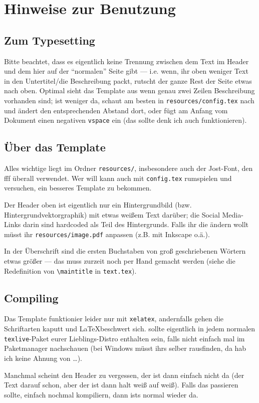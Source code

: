 \documentclass[a4paper]{article}
\newcommand{\maintitle}{F{\small FF-}T{\small EMPLATE}}
\begin{document}
\makeheader

\section{Hinweise zur Benutzung}

\subsection*{Zum Typesetting}

Bitte beachtet, dass es eigentlich keine Trennung zwischen dem Text im Header und dem hier auf der \enquote{normalen} Seite gibt --- i.e. wenn, ihr oben weniger Text in den Untertitel/die Beschreibung packt, rutscht der ganze Rest der Seite etwas nach oben. Optimal sieht das Template aus wenn genau zwei Zeilen Beschreibung vorhanden sind; ist weniger da, schaut am besten in \lstinline{resources/config.tex} nach und ändert den entsprechenden Abstand dort, oder fügt am Anfang vom Dokument einen negativen \lstinline{vspace} ein (das sollte denk ich auch funktionieren).

\subsection*{Über das Template}

Alles wichtige liegt im Ordner \lstinline{resources/}, insbesondere auch der Jost-Font, den fff überall verwendet. Wer will kann auch mit \lstinline{config.tex} rumspielen und versuchen, ein besseres Template zu bekommen.

Der Header oben ist eigentlich nur ein Hintergrundbild (bzw. Hintergrundvektorgraphik) mit etwas weißem Text darüber; die Social Media-Links darin sind hardcoded als Teil des Hintergrunds. Falls ihr die ändern wollt müsst ihr \lstinline{resources/image.pdf} anpassen (z.B. mit Inkscape o.ä.).

In der Überschrift sind die ersten Buchstaben von groß geschriebenen Wörtern etwas größer --- das muss zurzeit noch per Hand gemacht werden (siehe die Redefinition von \lstinline{\maintitle} in \lstinline{text.tex}).


\subsection*{Compiling}

Das Template funktionier leider nur mit \lstinline{xelatex}, andernfalls gehen die Schriftarten kaputt und \LaTeX beschwert sich. \XeLaTeX sollte eigentlich in jedem normalen \lstinline{texlive}-Paket eurer Lieblings-Distro enthalten sein, falls nicht einfach mal im Paketmanager nachschauen (bei Windows müsst ihrs selber rausfinden, da hab ich keine Ahnung von …).

Manchmal scheint \XeLaTeX den Header zu vergessen, der ist dann einfach nicht da (der Text darauf schon, aber der ist dann halt weiß auf weiß). Falls das passieren sollte, einfach nochmal kompiliern, dann ists normal wieder da.
\end{document}
